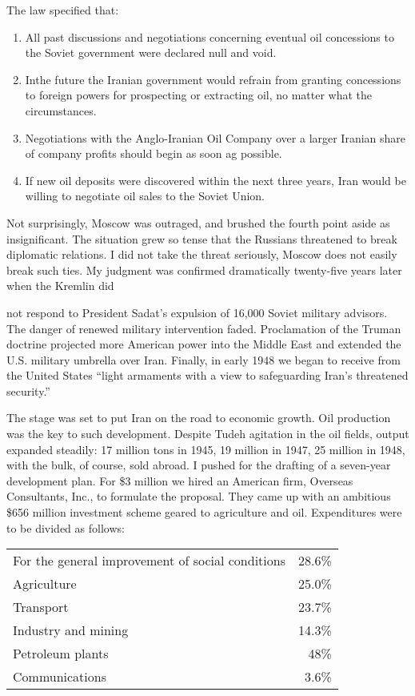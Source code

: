 The law specified that: 
\begin{enumerate}
\item All past discussions and negotiations concerning eventual oil concessions to the Soviet government were declared null and void. 

\item Inthe future the Iranian government would refrain from granting concessions to foreign powers for prospecting or extracting oil, no matter what the circumstances. 

\item Negotiations with the Anglo-Iranian Oil Company over a larger Iranian share of company profits should begin as soon ag possible. 

\item If new oil deposits were discovered within the next three years, Iran would be willing to negotiate oil sales to the Soviet Union. 
\end{enumerate}

Not surprisingly, Moscow was outraged, and brushed the fourth point aside as insignificant. The situation grew so tense that the Russians threatened to break diplomatic relations. I did not take the threat seriously, Moscow does not easily break such ties. My judgment was confirmed dramatically twenty-five years later when the Kremlin did 



not respond to President Sadat's expulsion of 16,000 Soviet military advisors. The danger of renewed military intervention faded. Proclamation of the Truman doctrine projected more American power into the Middle East and extended the U.S. military umbrella over Iran. Finally, in early 1948 we began to receive from the United States “light armaments with a view to safeguarding Iran's threatened security.” 

The stage was set to put Iran on the road to economic growth. Oil production was the key to such development. Despite Tudeh agitation in the oil fields, output expanded steadily: 17 million tons in 1945, 19 million in 1947, 25 million in 1948, with the bulk, of course, sold abroad. I pushed for the drafting of a seven-year development plan. For \$3 million we hired an American firm, Overseas Consultants, Inc., to formulate the proposal. They came up with an ambitious \$656 million investment scheme geared to agriculture and oil. Expenditures were to be divided as follows: 

\begin{tabular}{lr}
For the general improvement of social conditions &28.6\%\\ 
Agriculture &25.0\% \\
Transport &23.7\% \\
Industry and mining &14.3\% \\
Petroleum plants &48\% \\
Communications &3.6\% \\
\end{tabular}


